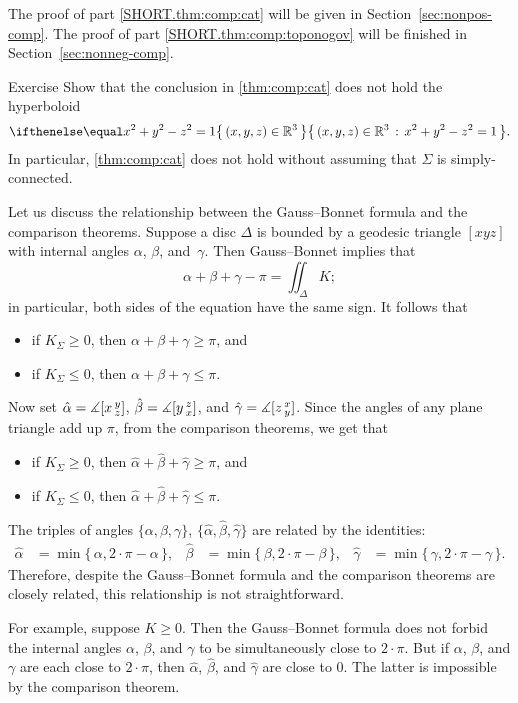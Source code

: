 The proof of part \ref{SHORT.thm:comp:cat} will be given in Section~\ref{sec:nonpos-comp}.
The proof of part \ref{SHORT.thm:comp:toponogov} will be finished in Section~\ref{sec:nonneg-comp}.


\begin{thm}{Exercise}\label{ex:thm:comp:cat:nsc}
Show that the conclusion in \ref{thm:comp:cat} does not hold the hyperboloid
\[\set{(x,y,z)\in\mathbb{R}^3}{x^2+y^2-z^2=1}.\]
In particular, \ref{thm:comp:cat} does not hold without assuming that $\Sigma$ is simply-connected.
\end{thm}

Let us discuss the relationship between the Gauss--Bonnet formula and the comparison theorems.
Suppose a disc $\Delta$ is bounded by a geodesic triangle $[xyz]$ with internal angles $\alpha$, $\beta$, and~$\gamma$.
Then Gauss--Bonnet implies that 
\[\alpha+\beta+\gamma-\pi=\iint_\Delta K;\]
in particular, both sides of the equation have the same sign.
It follows that
\begin{itemize}
\item if $K_\Sigma\ge 0$, then $\alpha+\beta+\gamma\ge\pi$, and
\item if $K_\Sigma\le 0$, then $\alpha+\beta+\gamma\le\pi$.
\end{itemize}

Now set 
$\hat\alpha=\measuredangle[x\,{}^{y}_{z}]$,
$\hat\beta=\measuredangle[y\,{}^{z}_{x}]$,
and $\hat\gamma=\measuredangle[z\,{}^{x}_{y}]$.
Since the angles of any plane triangle add up $\pi$, from the comparison theorems, we get that
\begin{itemize}
\item if $K_\Sigma\ge 0$, then $\hat\alpha+\hat\beta+\hat\gamma\ge\pi$, and
\item if $K_\Sigma\le 0$, then $\hat\alpha+\hat\beta+\hat\gamma\le\pi$.
\end{itemize}

The triples of angles $\{ \alpha , \beta , \gamma \}$, $\{ \hat\alpha , \hat\beta , \hat\gamma \}$ are related by the identities:
\begin{align*}
\hat \alpha&=\min\{\,\alpha,2\cdot\pi-\alpha\,\},
&
\hat\beta &=\min\{\,\beta,2\cdot\pi-\beta\,\},
&
\hat\gamma&=\min\{\,\gamma,2\cdot\pi-\gamma\,\}.
\end{align*}
Therefore, despite the Gauss--Bonnet formula and the comparison theorems are closely related,
this relationship is not straightforward.

For example, suppose $K\ge 0$.
Then the Gauss--Bonnet formula does not forbid the internal angles $\alpha$, $\beta$, and $\gamma$ to be simultaneously close to $2\cdot\pi$.
But if $\alpha$, $\beta$, and $\gamma$ are each close to $2\cdot\pi$, then $\hat\alpha$, $\hat\beta$, and $\hat\gamma$ are close to $0$.
The latter is impossible by the comparison theorem.


